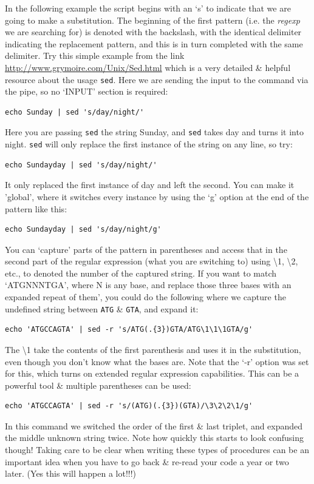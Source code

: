 \documentclass[a4paper,12pt,twoside]{memoir}
\begin{document}
\begin{steps}
In the following example the script begins with an `s' to indicate that we are going to make a substitution.
The beginning of the first pattern (i.e. the \textit{regexp} we are searching for) is denoted with the backslash, with the identical delimiter indicating the replacement pattern, and this is in turn completed with the same delimiter.
Try this simple example from the link \url{http://www.grymoire.com/Unix/Sed.html} which is a very detailed \& helpful resource about the usage \texttt{sed}.
Here we are sending the input to the command via the pipe, so no `INPUT' section is required: \\
\begin{lstlisting}
echo Sunday | sed 's/day/night/' 
\end{lstlisting}
Here you are passing \texttt{sed} the string Sunday, and \texttt{sed} takes day and turns it into night.  
\texttt{sed} will only replace the first instance of the string on any line, so try: \\
\begin{lstlisting}
echo Sundayday | sed 's/day/night/' 
\end{lstlisting}
It only replaced the first instance of day and left the second.  You can make it 'global', where it switches every instance by using the `g' option at the end of the pattern like this: \\
\begin{lstlisting}
echo Sundayday | sed 's/day/night/g' 
\end{lstlisting}
You can `capture' parts of the pattern in parentheses and access that in the second part of the regular expression (what you are switching to) using \textbackslash 1, \textbackslash 2, etc., to denoted the number of the captured string.
If you want to match `ATGNNNTGA', where N is any base, and replace those three bases with an expanded repeat of them', you could do the following where we capture the undefined string between \texttt{ATG} \& \texttt{GTA}, and expand it: \\
\begin{lstlisting}
echo 'ATGCCAGTA' | sed -r 's/ATG(.{3})GTA/ATG\1\1\1GTA/g'
\end{lstlisting}
The \textbackslash 1 take the contents of the first parenthesis and uses it in the substitution, even though you don't know what the bases are.
Note that the `-r' option was set for this, which turns on extended regular expression capabilities.
This can be a powerful tool \& multiple parentheses can be used: \\
\begin{lstlisting}
echo 'ATGCCAGTA' | sed -r 's/(ATG)(.{3})(GTA)/\3\2\2\1/g'
\end{lstlisting}
In this command we switched the order of the first \& last triplet, and expanded the middle unknown string twice.
Note how quickly this starts to look confusing though!
Taking care to be clear when writing these types of procedures can be an important idea when you have to go back \& re-read your code a year or two later.
(Yes this will happen a lot!!!)
\end{steps}
\end{document}
